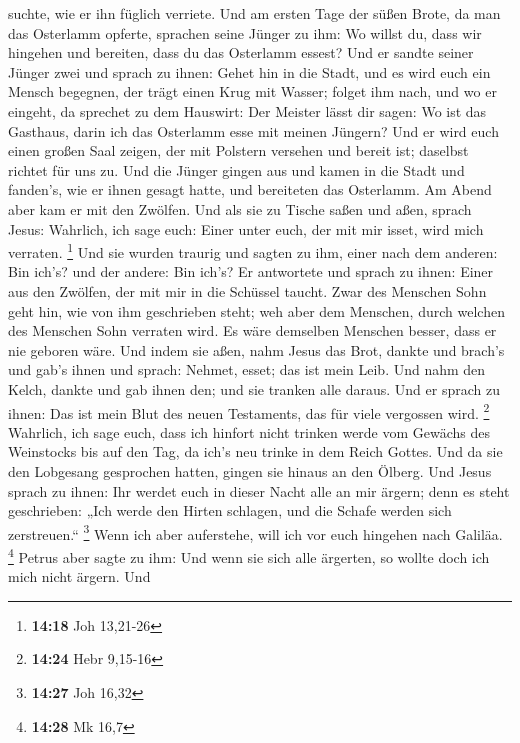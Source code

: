 suchte, wie er ihn füglich verriete.  Und am ersten Tage
der süßen Brote, da man das Osterlamm opferte, sprachen seine Jünger zu
ihm: Wo willst du, dass wir hingehen und bereiten, dass du das Osterlamm
essest?  Und er sandte seiner Jünger zwei und sprach zu
ihnen: Gehet hin in die Stadt, und es wird euch ein Mensch begegnen, der
trägt einen Krug mit Wasser; folget ihm nach,  und wo er
eingeht, da sprechet zu dem Hauswirt: Der Meister lässt dir sagen: Wo
ist das Gasthaus, darin ich das Osterlamm esse mit meinen Jüngern?
 Und er wird euch einen großen Saal zeigen, der mit
Polstern versehen und bereit ist; daselbst richtet für uns zu.
 Und die Jünger gingen aus und kamen in die Stadt und
fanden's, wie er ihnen gesagt hatte, und bereiteten das Osterlamm.
 Am Abend aber kam er mit den Zwölfen.  Und
als sie zu Tische saßen und aßen, sprach Jesus: Wahrlich, ich sage euch:
Einer unter euch, der mit mir isset, wird mich verraten. \footnote{\textbf{14:18}
  Joh 13,21-26}  Und sie wurden traurig und sagten zu ihm,
einer nach dem anderen: Bin ich's? und der andere: Bin ich's?
 Er antwortete und sprach zu ihnen: Einer aus den Zwölfen,
der mit mir in die Schüssel taucht.  Zwar des Menschen Sohn
geht hin, wie von ihm geschrieben steht; weh aber dem Menschen, durch
welchen des Menschen Sohn verraten wird. Es wäre demselben Menschen
besser, dass er nie geboren wäre.  Und indem sie aßen, nahm
Jesus das Brot, dankte und brach's und gab's ihnen und sprach: Nehmet,
esset; das ist mein Leib.  Und nahm den Kelch, dankte und
gab ihnen den; und sie tranken alle daraus.  Und er sprach
zu ihnen: Das ist mein Blut des neuen Testaments, das für viele
vergossen wird. \footnote{\textbf{14:24} Hebr 9,15-16} 
Wahrlich, ich sage euch, dass ich hinfort nicht trinken werde vom
Gewächs des Weinstocks bis auf den Tag, da ich's neu trinke in dem Reich
Gottes.  Und da sie den Lobgesang gesprochen hatten, gingen
sie hinaus an den Ölberg.  Und Jesus sprach zu ihnen: Ihr
werdet euch in dieser Nacht alle an mir ärgern; denn es steht
geschrieben: „Ich werde den Hirten schlagen, und die Schafe werden sich
zerstreuen.`` \footnote{\textbf{14:27} Joh 16,32}  Wenn ich
aber auferstehe, will ich vor euch hingehen nach Galiläa. \footnote{\textbf{14:28}
  Mk 16,7}  Petrus aber sagte zu ihm: Und wenn sie sich
alle ärgerten, so wollte doch ich mich nicht ärgern.  Und
